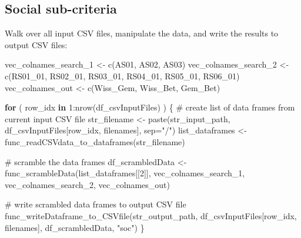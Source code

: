 \documentclass[
]{article}
\newenvironment{Shaded}{\begin{snugshade}}{\end{snugshade}}
\newcommand{\AttributeTok}[1]{\textcolor[rgb]{0.00,0.34,0.68}{#1}}
\newcommand{\CommentTok}[1]{\textcolor[rgb]{0.54,0.53,0.53}{#1}}
\newcommand{\ControlFlowTok}[1]{\textcolor[rgb]{0.12,0.11,0.11}{\textbf{#1}}}
\newcommand{\DecValTok}[1]{\textcolor[rgb]{0.69,0.50,0.00}{#1}}
\newcommand{\FunctionTok}[1]{\textcolor[rgb]{0.39,0.29,0.61}{#1}}
\newcommand{\NormalTok}[1]{\textcolor[rgb]{0.12,0.11,0.11}{#1}}
\newcommand{\OtherTok}[1]{\textcolor[rgb]{0.00,0.43,0.16}{#1}}
\newcommand{\SpecialCharTok}[1]{\textcolor[rgb]{0.24,0.68,0.91}{#1}}
\newcommand{\StringTok}[1]{\textcolor[rgb]{0.75,0.01,0.01}{#1}}
\begin{document}
\hypertarget{social-sub-criteria}{%
\subsection{Social sub-criteria}\label{social-sub-criteria}}

Walk over all input CSV files, manipulate the data, and write the
results to output CSV files:

\begin{Shaded}
\begin{Highlighting}[]
\NormalTok{vec\_colnames\_search\_1 }\OtherTok{\textless{}{-}} \FunctionTok{c}\NormalTok{(}\StringTok{\textquotesingle{}AS01\textquotesingle{}}\NormalTok{, }\StringTok{\textquotesingle{}AS02\textquotesingle{}}\NormalTok{, }\StringTok{\textquotesingle{}AS03\textquotesingle{}}\NormalTok{)}
\NormalTok{vec\_colnames\_search\_2 }\OtherTok{\textless{}{-}} \FunctionTok{c}\NormalTok{(}\StringTok{\textquotesingle{}RS01\_01\textquotesingle{}}\NormalTok{, }\StringTok{\textquotesingle{}RS02\_01\textquotesingle{}}\NormalTok{, }\StringTok{\textquotesingle{}RS03\_01\textquotesingle{}}\NormalTok{, }\StringTok{\textquotesingle{}RS04\_01\textquotesingle{}}\NormalTok{, }\StringTok{\textquotesingle{}RS05\_01\textquotesingle{}}\NormalTok{, }\StringTok{\textquotesingle{}RS06\_01\textquotesingle{}}\NormalTok{)}
\NormalTok{vec\_colnames\_out }\OtherTok{\textless{}{-}} \FunctionTok{c}\NormalTok{(}\StringTok{\textquotesingle{}Wiss\_Gem\textquotesingle{}}\NormalTok{, }\StringTok{\textquotesingle{}Wiss\_Bet\textquotesingle{}}\NormalTok{, }\StringTok{\textquotesingle{}Gem\_Bet\textquotesingle{}}\NormalTok{)}

\ControlFlowTok{for}\NormalTok{ ( row\_idx }\ControlFlowTok{in} \DecValTok{1}\SpecialCharTok{:}\FunctionTok{nrow}\NormalTok{(df\_csvInputFiles) ) \{}
  \CommentTok{\# create list of data frames from current input CSV file}
\NormalTok{  str\_filename }\OtherTok{\textless{}{-}} \FunctionTok{paste}\NormalTok{(str\_input\_path, df\_csvInputFiles[row\_idx, filenames], }\AttributeTok{sep=}\StringTok{"/"}\NormalTok{)}
\NormalTok{  list\_dataframes }\OtherTok{\textless{}{-}} \FunctionTok{func\_readCSVdata\_to\_dataframes}\NormalTok{(str\_filename)}
  
  \CommentTok{\# scramble the data frames}
\NormalTok{  df\_scrambledData }\OtherTok{\textless{}{-}} \FunctionTok{func\_scrambleData}\NormalTok{(list\_dataframes[[}\DecValTok{2}\NormalTok{]], vec\_colnames\_search\_1, vec\_colnames\_search\_2, vec\_colnames\_out)}
  
  \CommentTok{\# write scrambled data frames to output CSV file}
  \FunctionTok{func\_writeDataframe\_to\_CSVfile}\NormalTok{(str\_output\_path, df\_csvInputFiles[row\_idx, filenames], df\_scrambledData, }\StringTok{"soc"}\NormalTok{)}
\NormalTok{\}}
\end{Highlighting}
\end{Shaded}
\end{document}
